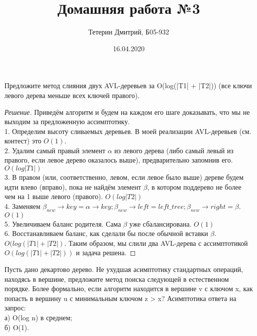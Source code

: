\documentclass[12pt]{article}
\newenvironment{problem}[2][Задача]{\begin{trivlist}
\item[\hskip \labelsep {\bfseries #1}\hskip \labelsep {\bfseries #2.}]}{\end{trivlist}}
\newenvironment{solution}{\begin{proof}[Решение]}{\end{proof}}
\begin{document}
 
 
\title{Домашняя работа №3}
\author{Тетерин Дмитрий, Б05-932}
\date{16.04.2020}
 
\maketitle



\begin{problem}{1}
    Предложите метод слияния двух AVL-деревьев за O(log(|T1| + |T2|)) (все ключи левого
дерева меньше всех ключей правого).
\end{problem}

\begin{solution}
    Приведём алгоритм и будем на каждом его шаге доказывать, что мы не выходим за предложенную ассимптотику.
    \\1. Определим высоту сливаемых деревьев. В моей реализации AVL-деревьев (см. контест) это $O(1)$. 
    \\2. Удалим самый правый элемент $\alpha$ из левого дерева (либо самый левый из правого, если левое дерево оказалось выше), предварительно запомнив его. $O(log |T1|)$
    \\3. В правом (или, соответственно, левом, если левое было выше) дереве будем идти влево (вправо), пока не найдём элемент $\beta$, в котором поддерево не более чем на 1 выше левого (правого). $O(log |T2|)$
    \\4. Заменяем $\beta_{new}\rightarrow key = \alpha\rightarrow key; \beta_{new}\rightarrow left = left\_tree; \beta_{new}\rightarrow right = \beta$. $O(1)$
    \\5. Увеличиваем баланс родителя. Сама $\beta$ уже сбалансирована. $O(1)$
    \\6. Восстанавливаем баланс, как сделали бы после обычной вставки $\beta$. $O(log (|T1| + |T2|)$.
    Таким образом, мы слили два AVL-дерева с ассимптотикой $O(log(|T1|+|T2|))$ и задача решена.
\end{solution}

\newpage
\begin{problem}{4}
    Пусть дано декартово дерево. Не ухудшая асимптотику стандартных операций, находясь в вершине,
предложите метод поиска следующей в естественном порядке. Более формально, если алгоритм находится в вершине v с ключом x, как попасть в вершину u с минимальным ключом z > x? Асимптотика
ответа на запрос:
\\а) O(log n) в среднем;
\\б) O(1).
\end{problem}
\end{document}
